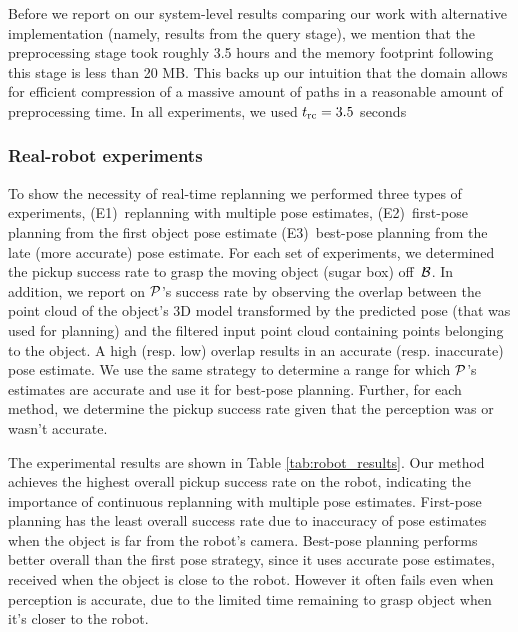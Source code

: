 \documentclass[conference]{IEEEtran}
\begin{document}
Before we report on our system-level results comparing our work with alternative implementation (namely, results from the query stage), we mention that the preprocessing stage took roughly 3.5 hours and the memory footprint following this stage is less than 20 MB.
%
This backs up our intuition that the domain allows for efficient compression of a massive amount of paths in a reasonable amount of preprocessing time. In all experiments, we used $t_{\textrm{rc}} =3.5$ seconds




\subsubsection{Real-robot experiments}
\label{sec:robot_results}
To show the necessity of real-time replanning we performed three types of experiments, 
(E1)~replanning with multiple pose estimates, 
(E2)~first-pose planning from the first object pose estimate 
(E3)~best-pose planning from the late (more accurate) pose estimate. 
%
For each set of experiments, we determined the pickup success rate to grasp the moving object (sugar box) off~$\mathcal{B}$. In addition, we report on $\mathcal{P}$'s success rate by observing the overlap between the point cloud of the object's 3D model transformed by the predicted pose (that was used for planning) and the filtered input point cloud containing points belonging to the object. 
A high (resp. low) overlap results in an accurate (resp. inaccurate) pose estimate. 
%
We use the same strategy to determine a range for which $\mathcal{P}$'s estimates are accurate and use it for best-pose planning. 
Further, for each method, we determine the pickup success rate given that the perception was or wasn't accurate. 

The experimental results are shown in Table \ref{tab:robot_results}. Our method achieves the highest overall pickup success rate on the robot, indicating the importance of continuous replanning with multiple pose estimates. 
First-pose planning has the least overall success rate due to inaccuracy of pose estimates when the object is far from the robot's camera. 
Best-pose planning performs better overall than the first pose strategy, since it uses accurate pose estimates, received when the object is close to the robot. However it often fails even when perception is accurate, due to the limited time remaining to grasp object when it's closer to the robot. 
\end{document}
